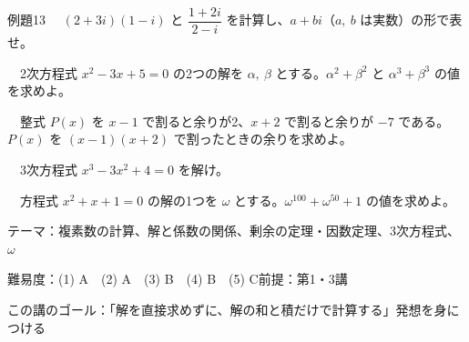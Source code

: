 \documentclass[paper=b5j, fontsize=8pt, fleqn, twoside]{jlreq}
\begin{document}
\begin{ascolorbox4A}[出典：オリジナル]{例題13}
  　$(2+3i)(1-i)$ と $\dfrac{1+2i}{2-i}$ を計算し、$a+bi$（$a,\ b$ は実数）の形で表せ。\par
  　2次方程式 $x^2-3x+5=0$ の2つの解を $\alpha,\ \beta$ とする。$\alpha^2+\beta^2$ と $\alpha^3+\beta^3$ の値を求めよ。\par
  　整式 $P(x)$ を $x-1$ で割ると余りが2、$x+2$ で割ると余りが $-7$ である。$P(x)$ を $(x-1)(x+2)$ で割ったときの余りを求めよ。\par
  　3次方程式 $x^3-3x^2+4=0$ を解け。\par
  　方程式 $x^2+x+1=0$ の解の1つを $\omega$ とする。$\omega^{100}+\omega^{50}+1$ の値を求めよ。
\end{ascolorbox4A}

\begin{Data}
  テーマ：複素数の計算、解と係数の関係、剰余の定理・因数定理、3次方程式、$\omega$\par
  難易度：(1) A　(2) A　(3) B　(4) B　(5) C\quad 前提：第1・3講\par
  この講のゴール：「解を直接求めずに、解の和と積だけで計算する」発想を身につける
\end{Data}
\end{document}
